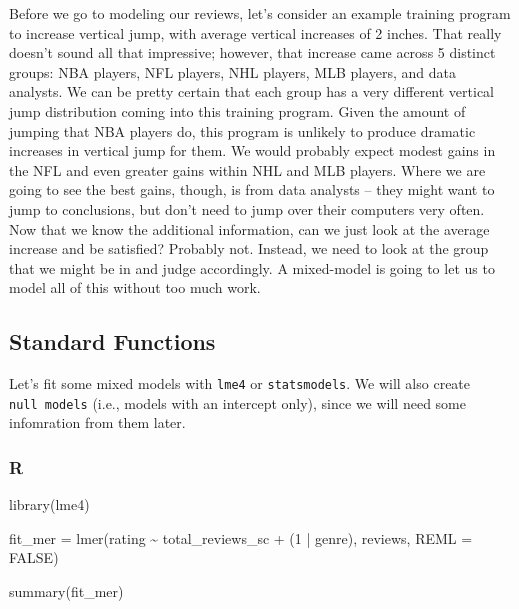\documentclass[
  letterpaper,
]{krantz}
\newenvironment{Shaded}{}{}
\newcommand{\AttributeTok}[1]{\textcolor[rgb]{0.49,0.56,0.16}{#1}}
\newcommand{\ConstantTok}[1]{\textcolor[rgb]{0.53,0.00,0.00}{#1}}
\newcommand{\DecValTok}[1]{\textcolor[rgb]{0.25,0.63,0.44}{#1}}
\newcommand{\FunctionTok}[1]{\textcolor[rgb]{0.02,0.16,0.49}{#1}}
\newcommand{\NormalTok}[1]{#1}
\newcommand{\OtherTok}[1]{\textcolor[rgb]{0.00,0.44,0.13}{#1}}
\newcommand{\SpecialCharTok}[1]{\textcolor[rgb]{0.25,0.44,0.63}{#1}}
\begin{document}
Before we go to modeling our reviews, let's consider an example training
program to increase vertical jump, with average vertical increases of 2
inches. That really doesn't sound all that impressive; however, that
increase came across 5 distinct groups: NBA players, NFL players, NHL
players, MLB players, and data analysts. We can be pretty certain that
each group has a very different vertical jump distribution coming into
this training program. Given the amount of jumping that NBA players do,
this program is unlikely to produce dramatic increases in vertical jump
for them. We would probably expect modest gains in the NFL and even
greater gains within NHL and MLB players. Where we are going to see the
best gains, though, is from data analysts -- they might want to jump to
conclusions, but don't need to jump over their computers very often. Now
that we know the additional information, can we just look at the average
increase and be satisfied? Probably not. Instead, we need to look at the
group that we might be in and judge accordingly. A mixed-model is going
to let us to model all of this without too much work.

\subsection{Standard Functions}\label{standard-functions-4}

Let's fit some mixed models with \texttt{lme4} or \texttt{statsmodels}.
We will also create \texttt{null\ models} (i.e., models with an
intercept only), since we will need some infomration from them later.

\subsubsection{R}

\begin{Shaded}
\begin{Highlighting}[]
\FunctionTok{library}\NormalTok{(lme4)}

\NormalTok{fit\_mer }\OtherTok{=} \FunctionTok{lmer}\NormalTok{(rating }\SpecialCharTok{\textasciitilde{}}\NormalTok{ total\_reviews\_sc }\SpecialCharTok{+}\NormalTok{ (}\DecValTok{1} \SpecialCharTok{|}\NormalTok{ genre), }
\NormalTok{               reviews, }
               \AttributeTok{REML =} \ConstantTok{FALSE}\NormalTok{)}

\FunctionTok{summary}\NormalTok{(fit\_mer)}
\end{Highlighting}
\end{Shaded}
\end{document}
